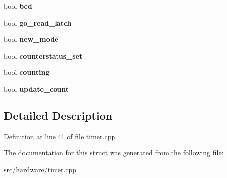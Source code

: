 \begin{DoxyCompactItemize}
\item 
\hypertarget{structPIT__Block_a8ddc522280bb994ea634aa855470836e}{bool {\bfseries bcd}}\label{structPIT__Block_a8ddc522280bb994ea634aa855470836e}

\item 
\hypertarget{structPIT__Block_a7a715f03e1acc563935446865c6ff565}{bool {\bfseries go\-\_\-read\-\_\-latch}}\label{structPIT__Block_a7a715f03e1acc563935446865c6ff565}

\item 
\hypertarget{structPIT__Block_acf24bddaa36c23e46f27c9b7127707a3}{bool {\bfseries new\-\_\-mode}}\label{structPIT__Block_acf24bddaa36c23e46f27c9b7127707a3}

\item 
\hypertarget{structPIT__Block_a048abc116ac6c60acfc407a6274a69ae}{bool {\bfseries counterstatus\-\_\-set}}\label{structPIT__Block_a048abc116ac6c60acfc407a6274a69ae}

\item 
\hypertarget{structPIT__Block_a22b10292f287bf33a2c5b456dce9bddc}{bool {\bfseries counting}}\label{structPIT__Block_a22b10292f287bf33a2c5b456dce9bddc}

\item 
\hypertarget{structPIT__Block_a81813382e0d2d0d1c79cf97713ae68df}{bool {\bfseries update\-\_\-count}}\label{structPIT__Block_a81813382e0d2d0d1c79cf97713ae68df}

\end{DoxyCompactItemize}


\subsection{Detailed Description}


Definition at line 41 of file timer.\-cpp.



The documentation for this struct was generated from the following file\-:\begin{DoxyCompactItemize}
\item 
src/hardware/timer.\-cpp\end{DoxyCompactItemize}
